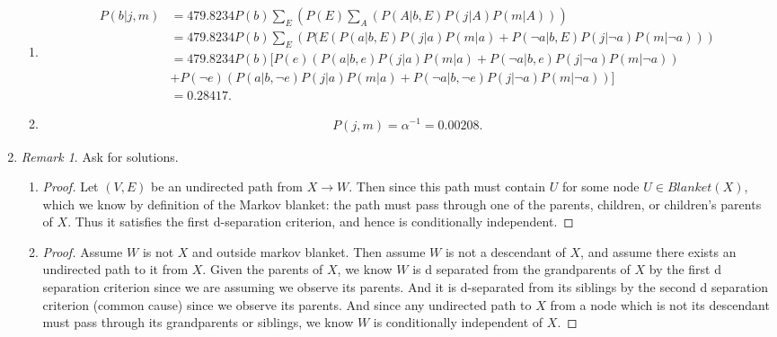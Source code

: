 \documentclass[12pt,oneside,reqno]{amsart}
\theoremstyle{plain}
\theoremstyle{definition}
\theoremstyle{remark}
\newtheorem{rem}[theorem]{Remark}
\newcommand{\bee}{\begin{equation}\begin{aligned}}
\newcommand{\eee}{\end{aligned}\end{equation}}
\begin{document}
\begin{enumerate}[label=\arabic*.]
\begin{enumerate}
\item \bee
P(b|j,m) &= 479.8234 P(b)\sum_E\left( P(E) \sum_A \left(P(A|b,E)P(j|A)P(m|A)\right) \right)\\
&= 479.8234 P(b)\sum_E\left( P(E \left(P(a|b,E)P(j|a)P(m|a) +P(\neg a|b,E)P(j|\neg a)P(m|\neg a) \right) \right)\\
&= 479.8234 P(b) [P(e) \left(P(a|b,e)P(j|a)P(m|a) +P(\neg a|b,e)P(j|\neg a)P(m|\neg a) \right)\\
&+ P(\neg e) \left(P(a|b,\neg e)P(j|a)P(m|a) +P(\neg a|b,\neg e)P(j|\neg a)P(m|\neg a) \right)]\\
&= 0.28417.
\eee
\item 
\bee
P(j,m) = \alpha^{-1} = 0.00208.
\eee

\end{enumerate}

\item 

\begin{rem}
Ask for solutions. 
\end{rem}

\begin{enumerate}
\item 
\begin{proof}
Let $(V,E)$ be an undirected path from $X \to W$. Then since this path must contain $U$ for some node $U \in Blanket(X)$, which we know by definition of the Markov blanket: the path must pass through one of the parents, children, or children's parents of $X$. Thus it satisfies the first d-separation criterion, and hence is conditionally independent. 
\end{proof}

\item \begin{proof}
 Assume $W$ is not $X$ and outside markov blanket. Then assume $W$ is not a descendant of $X$, and assume there exists an undirected path to it from $X$. Given the parents of $X$, we know $W$ is d separated from the grandparents of $X$ by the first d separation criterion since we are assuming we observe its parents. And it is d-separated from its siblings by the second d separation criterion (common cause) since we observe its parents. And since any undirected path to $X$ from a node which is not its descendant must pass through its grandparents or siblings, we know $W$ is conditionally independent of $X$. 
\end{proof}

\end{enumerate}


\end{enumerate}
\end{document}
